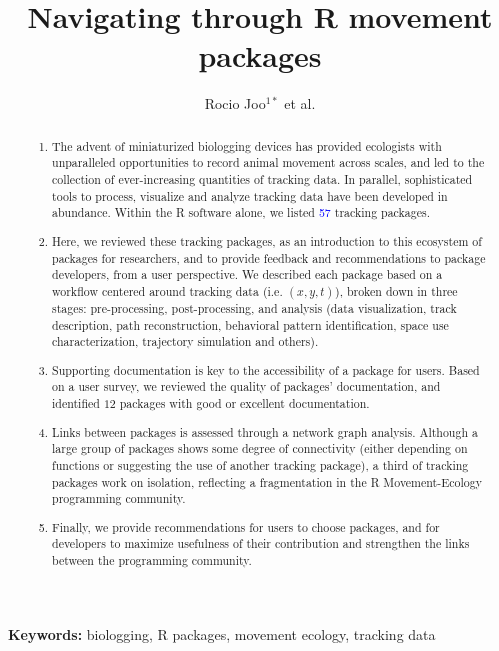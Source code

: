 \documentclass[a4paper,12pt]{article}
\title{Navigating through R movement packages}
\author{Rocio Joo$^{1*}$ et al.}
\begin{document}
\maketitle


\begin{abstract}
  \noindent \begin{enumerate}
\item The advent of miniaturized biologging devices has provided ecologists with unparalleled opportunities to record animal movement across scales, and led to the collection of ever-increasing quantities of tracking data. In parallel, sophisticated tools to process, visualize and analyze tracking data have been developed in abundance. Within the R software alone, we listed \textcolor{blue}{57} tracking packages. 
  \item Here, we reviewed these tracking packages, as an introduction to this ecosystem of packages for researchers, and to provide feedback and recommendations to package developers, from a user perspective. We described each package based on a workflow centered around tracking data (i.e. $(x,y,t)$), broken down in three stages: pre-processing, post-processing, and analysis (data visualization, track description, path reconstruction, behavioral pattern identification, space use characterization, trajectory simulation and others).
  \item Supporting documentation is key to the accessibility of a package for users. Based on a user survey, we reviewed the quality of packages' documentation, and identified $12$ packages with good or excellent documentation. 
  \item Links between packages is assessed through a network graph analysis. Although a large group of packages shows some degree of connectivity (either depending on functions or suggesting the use of another tracking package), a third of tracking packages work on isolation, reflecting a fragmentation in the R Movement-Ecology programming community. 
  \item Finally, we provide recommendations for users to choose packages, and for developers to maximize usefulness of their contribution and strengthen the links between the programming community. %
  \end{enumerate}
\end{abstract}

\noindent \textbf{Keywords:} biologging, R packages, movement ecology, tracking data
\end{document}
